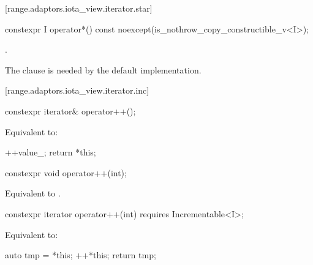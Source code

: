 [range.adaptors.iota_view.iterator.star]{}

\begin{itemdecl}
constexpr I operator*() const noexcept(is_nothrow_copy_constructible_v<I>);
\end{itemdecl}

\begin{itemdescr}
\pnum
\returns {}.

\pnum
\begin{note}
The  clause is needed by the default 
implementation.
\end{note}
\end{itemdescr}

[range.adaptors.iota_view.iterator.inc]{}

\begin{itemdecl}
constexpr iterator& operator++();
\end{itemdecl}

\begin{itemdescr}
\pnum
\effects Equivalent to:
\begin{codeblock}
++value_;
return *this;
\end{codeblock}
\end{itemdescr}

\begin{itemdecl}
constexpr void operator++(int);
\end{itemdecl}

\begin{itemdescr}
\pnum
\effects Equivalent to .
\end{itemdescr}

\begin{itemdecl}
constexpr iterator operator++(int) requires Incrementable<I>;
\end{itemdecl}

\begin{itemdescr}
\pnum
\effects Equivalent to:
\begin{codeblock}
auto tmp = *this;
++*this;
return tmp;
\end{codeblock}
\end{itemdescr}

